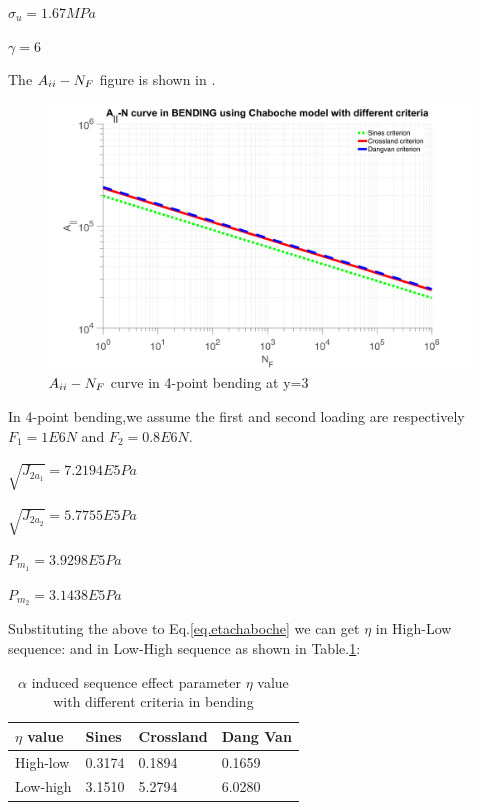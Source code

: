 $\sigma_{u}=1.67MPa$ 

$\gamma=6$

The $A_{\uppercase\expandafter{\romannumeral2}}-N_F$ figure is shown in .
\begin{figure}[!h]
	\centering
	\includegraphics[width=\textwidth]{figures//JNbending.png} 
	\caption{$A_{\uppercase\expandafter{\romannumeral2}}-N_F$ curve in 4-point bending at y=3}
	\label{JNbending}
\end{figure}

In 4-point bending,we assume the first and second loading are respectively $F_1=1E6 N$ and $F_2=0.8E6 N$. 

\vspace{6pt}
$\sqrt{J_{2a_1}}=7.2194E5 Pa$

\vspace{6pt}
$\sqrt{J_{2a_2}}=5.7755E5 Pa$

\vspace{6pt}
$P_{m_1}=3.9298E5 Pa$

\vspace{6pt}
$P_{m_2}=3.1438E5 Pa$

Substituting the above to Eq.\eqref{eq.etachaboche} we can get $\eta$ in High-Low sequence:
and in Low-High sequence as shown in Table.\ref{tab.etabending}:
\begin{table}[!h]
	\centering
	\begin{tabular}{llll}
		\hline
		$\eta$ value   & Sines  & Crossland & Dang Van \\ \hline
		High-low & 0.3174 & 0.1894    &  0.1659   \\
		Low-high & 3.1510 & 5.2794   & 6.0280  \\ \hline
	\end{tabular}
	\caption{$\alpha$ induced sequence effect parameter $\eta$ value with different criteria in bending}
	\label{tab.etabending}
\end{table}

